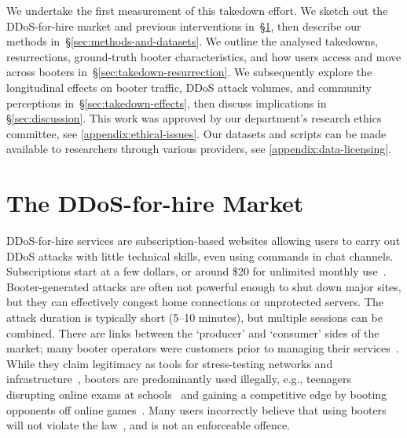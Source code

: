 \documentclass[letterpaper,twocolumn,10pt]{article}
\begin{document}
We undertake the first measurement of this takedown effort. We sketch out the DDoS-for-hire market and previous interventions in~\S\ref{sec:ddos-for-hire-market}, then describe our methods in~\S\ref{sec:methods-and-datasets}. We outline the analysed takedowns, resurrections, ground-truth booter characteristics, and how users access and move across booters in~\S\ref{sec:takedown-resurrection}. We subsequently explore the longitudinal effects on booter traffic, DDoS attack volumes, and community perceptions in~\S\ref{sec:takedown-effects}, then discuss implications in \S\ref{sec:discussion}. This work was approved by our department's research ethics committee, see \autoref{appendix:ethical-issues}. Our datasets and scripts can be made available to researchers through various providers, see \autoref{appendix:data-licensing}.

\pagestyle{fancy}
\fancyfoot[C]{}

\section{The DDoS-for-hire Market} \label{sec:ddos-for-hire-market}
DDoS-for-hire services are subscription-based websites allowing users to carry out DDoS attacks with little technical skills, even using commands in chat channels. Subscriptions start at a few dollars, or around \$20 for unlimited monthly use~\cite{hutchings2016exploring, karami2013understanding}. Booter-generated attacks are often not powerful enough to shut down major sites, but they can effectively congest home connections or unprotected servers. The attack duration is typically short (5--10 minutes), but multiple sessions can be combined. There are links between the `producer' and `consumer' sides of the market; many booter operators were customers prior to managing their services~\cite{hutchings2016exploring,gatrelarrest}. While they claim legitimacy as tools for stress-testing networks and infrastructure~\cite{krebthinkagain}, booters are predominantly used illegally, e.g., teenagers disrupting online exams at schools~\cite{santanna2015booters} and gaining a competitive edge by booting opponents off online games~\cite{karami2013understanding}. Many users incorrectly believe that using booters will not violate the law~\cite{hutchings2016exploring}, and is not an enforceable offence.
\end{document}
